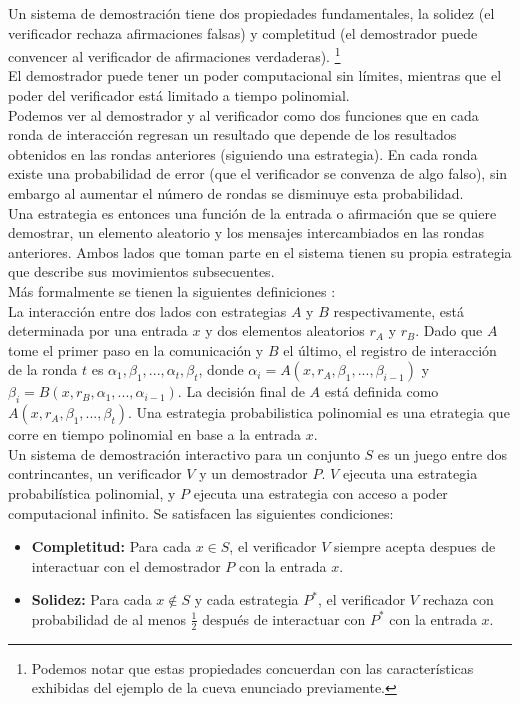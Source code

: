 \documentclass[oneside,10pt]{article}
\begin{document}
Un sistema de demostración tiene dos propiedades fundamentales, la solidez (el verificador rechaza afirmaciones falsas) y completitud (el demostrador puede convencer al verificador de afirmaciones verdaderas). \footnote{Podemos notar que estas propiedades concuerdan con las características exhibidas del ejemplo de la cueva enunciado previamente.} \\

El demostrador puede tener un poder computacional sin límites, mientras que el poder del verificador está limitado a tiempo polinomial. \\

Podemos ver  al demostrador y al verificador como dos funciones que en cada ronda de interacción regresan un resultado que depende de los resultados obtenidos en las rondas anteriores (siguiendo una estrategia). En cada ronda existe una probabilidad de error (que el verificador se convenza de algo falso), sin embargo al aumentar el número de rondas se disminuye esta probabilidad. \\

Una estrategia es entonces una función de la entrada o afirmación que se quiere demostrar, un elemento aleatorio y los mensajes intercambiados en las rondas anteriores. Ambos lados que toman parte en el sistema tienen su propia estrategia que describe sus movimientos subsecuentes. \\

Más formalmente se tienen la siguientes definiciones \cite{oded}: \\

La interacción entre dos lados con estrategias $A$ y $B$ respectivamente, está determinada por una entrada $x$ y dos elementos aleatorios $r_A$ y $r_B$. Dado que $A$ tome el primer paso en la comunicación y $B$ el último, el \textsf{registro de interacción} de la ronda $t$ es $\alpha_1, \beta_1,...,\alpha_t, \beta_t$, donde $\alpha_i = A(x, r_A, \beta_1,...,\beta_{i-1})$ y $\beta_i = B(x, r_B, \alpha_1,...,\alpha_{i-1})$. La decisión final de $A$ está definida como $A(x,r_A,\beta_1,...,\beta_t)$. Una estrategia probabilistica polinomial es una etrategia que corre en tiempo polinomial en base a la entrada $x$. \\

Un \textsf{sistema de demostración interactivo} para un conjunto $S$ es un juego entre dos contrincantes, un verificador $V$ y un demostrador $P$.
$V$ ejecuta una estrategia probabilística polinomial, y $P$ ejecuta una estrategia con acceso a poder computacional infinito. Se satisfacen las siguientes condiciones: 
\begin{itemize}
\item \textbf{Completitud:} Para cada $x \in S$, el verificador $V$ siempre acepta despues de interactuar con el demostrador $P$ con la entrada $x$.
\item \textbf{Solidez:} Para cada $x \notin S$ y cada estrategia $P^*$, el verificador $V$ rechaza con probabilidad de al menos $\frac {1}{2}$ después de interactuar con $P^*$ con la entrada $x$.
\end{itemize}
\end{document}
